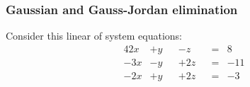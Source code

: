 \documentclass[../linear-algebra.tex]{subfiles}
\begin{document}
\subsubsection{Gaussian and Gauss-Jordan elimination}
Consider this linear of system equations:
\begin{alignat*}{4}
     2x &+  y &&-  z &&= &  8 \\
    -3x &-  y &&+ 2z &&= &-11 \\
    -2x &+  y &&+ 2z &&= &-3
\end{alignat*}
\end{document}
